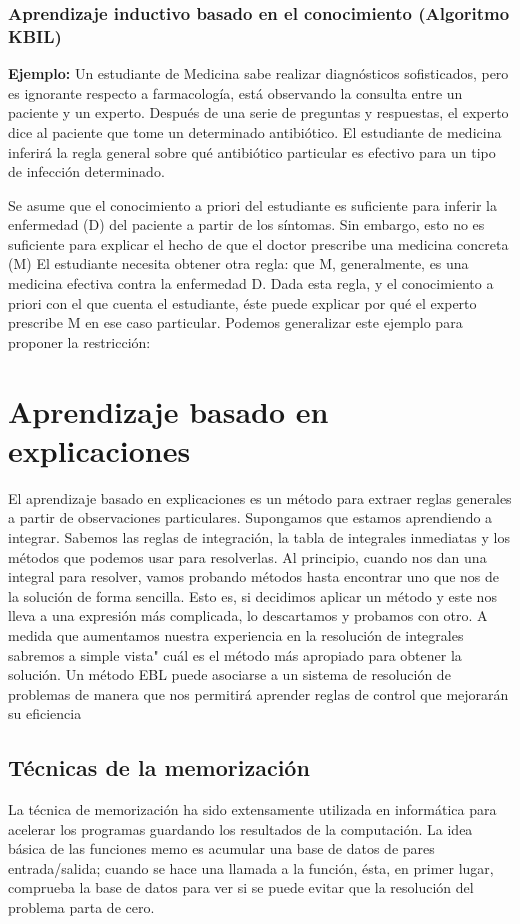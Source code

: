 \documentclass[12 pt, a4paper]{article}
\begin{document}
			\subsubsection{Aprendizaje inductivo basado en el conocimiento (Algoritmo KBIL)}
			\textbf{Ejemplo:} Un estudiante de Medicina sabe realizar diagnósticos sofisticados, pero es ignorante respecto a farmacología, está observando la consulta entre un paciente y un experto. Después de una serie de preguntas y respuestas, el experto dice al paciente que tome un determinado antibiótico. El estudiante de medicina inferirá la regla general sobre qué antibiótico particular es efectivo para un tipo de infección determinado.
			
			Se asume que el conocimiento a priori del estudiante es suficiente para inferir la enfermedad (D) del paciente a partir de los síntomas. Sin embargo, esto no es suficiente para explicar el hecho de que el doctor prescribe una medicina concreta (M) El estudiante necesita obtener otra regla: que M, generalmente, es una medicina efectiva contra la enfermedad D. Dada esta regla, y el conocimiento a priori con el que cuenta el estudiante, éste puede explicar por qué el experto prescribe M en ese caso particular. Podemos generalizar este ejemplo para proponer la restricción:
			
	 \section{Aprendizaje basado en explicaciones}
	 		El aprendizaje basado en explicaciones es un método para extraer reglas generales a partir de observaciones particulares.
	 		Supongamos que estamos aprendiendo a integrar. Sabemos las reglas de integración, la tabla de integrales inmediatas y los métodos que podemos usar para resolverlas. Al principio, cuando nos dan una integral para resolver, vamos probando métodos hasta encontrar uno que nos de la solución de forma sencilla. Esto es, si decidimos aplicar un método y este nos lleva a una expresión más complicada, lo descartamos y probamos con otro. A medida que aumentamos nuestra experiencia en la resolución de integrales sabremos a simple vista" cuál es el método más apropiado para obtener la solución. Un método EBL puede asociarse a un sistema de resolución de problemas de manera que nos permitirá aprender reglas de control que mejorarán su eficiencia
	 		\subsection{Técnicas de la memorización}
	 		La técnica de memorización ha sido extensamente utilizada en informática para acelerar los programas guardando los resultados de la computación. La idea básica de las funciones memo es acumular una base de datos de pares entrada/salida; cuando se hace una llamada a la función, ésta, en primer lugar, comprueba la base de datos para ver si se puede evitar que la resolución del problema parta de cero.
	 		
\end{document}
